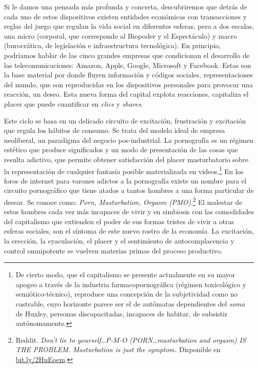 Si le damos una pensada más profunda y concreta, descubriremos que detrás de cada uno de estos dispositivos existen entidades económicas con transacciones y reglas del juego que regulan la vida social en diferentes esferas, pero a dos escalas, una micro (corporal, que corresponde al Biopoder y el Espectáculo) y macro (burocrática, de legislación e infraestructura tecnológica). En principio, podríamos hablar de las cinco grandes empresas que condicionan el desarrollo de las telecomunicaciones: Amazon, Apple, Google, Microsoft y Facebook. Estas son la base material por donde fluyen información y códigos sociales, representaciones del mundo, que son reproducidas en los dispositivos personales para provocar una reacción, un deseo. Esta nueva forma del capital explota reacciones, capitaliza el placer que puede cuantificar en \emph{clics} y \emph{shares}.

Este ciclo se basa en un delicado circuito de excitación, frustración y excitación que regula los hábitos de consumo. Se trata del modelo ideal de empresa neoliberal, un paradigma del negocio pos-industrial. La pornografía es un régimen estético que produce significados y un modo de presentación de las cosas que resulta adictivo, que permite obtener satisfacción del placer masturbatorio sobre la representación de cualquier fantasía posible materializada en videos.\footnote{De cierto modo, que el capitalismo se presente actualmente en su mayor apogeo a través de la industria farmacopornográfica (régimen toxicológico y semiótico-técnico), reproduce una concepción de la subjetividad como no castrable, cuyo horizonte parece ser el de autómatas dependientes del \emph{soma} de Huxley, personas discapacitadas, incapaces de habitar, de subsistir autónomamente.} En los foros de internet para varones adictos a la pornografía existe un nombre para el circuito pornográfico que tiene atados a tantos hombres a una forma particular de desear. Se conoce como: \emph{Porn, Masturbation, Orgasm (PMO)}.\footnote{Reddit. \emph{Don't lie to yourself\ldots P-M-O (PORN\ldots masturbation and orgasm) IS THE PROBLEM. Masturbation is just the symptom.} Disponible en \url{bit.ly/2HuEoem}.} El malestar de estos hombres cada vez más incapaces de vivir y en simbiosis con las comodidades del capitalismo que extienden el poder de sus formas tristes de vivir a otras esferas sociales, son el síntoma de este nuevo rostro de la economía. La excitación, la erección, la eyaculación, el placer y el sentimiento de autocomplacencia y control omnipotente se vuelven materias primas del proceso productivo.

